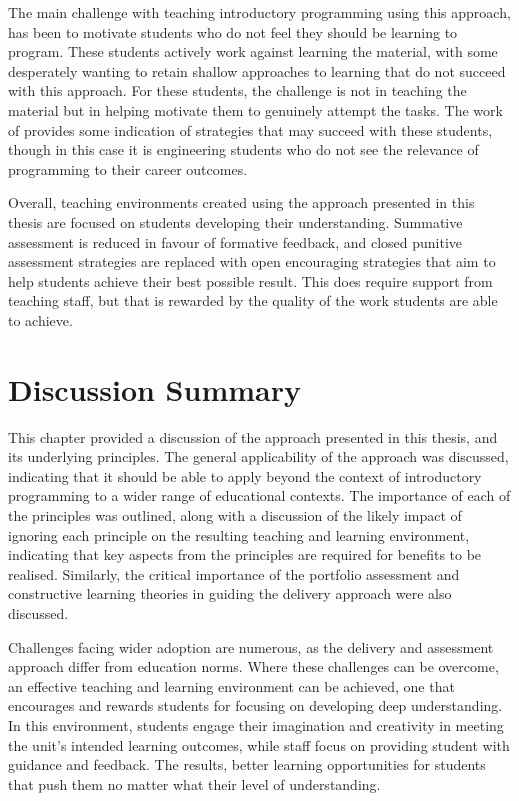 The main challenge with teaching introductory programming using this approach, has been to motivate students who do not feel they should be learning to program. These students actively work against learning the material, with some desperately wanting to retain shallow approaches to learning that do not succeed with this approach. For these students, the challenge is not in teaching the material but in helping motivate them to genuinely attempt the tasks. The work of \citet{Guzdial:2005} provides some indication of strategies that may succeed with these students, though in this case it is engineering students who do not see the relevance of programming to their career outcomes. 

Overall, teaching environments created using the approach presented in this thesis are focused on students developing their understanding. Summative assessment is reduced in favour of formative feedback, and closed punitive assessment strategies are replaced with open encouraging strategies that aim to help students achieve their best possible result. This does require support from teaching staff, but that is rewarded by the quality of the work students are able to achieve. 


\section{Discussion Summary} %
\label{sec:disc_summary}

This chapter provided a discussion of the approach presented in this thesis, and its underlying principles. The general applicability of the approach was discussed, indicating that it should be able to apply beyond the context of introductory programming to a wider range of educational contexts. The importance of each of the principles was outlined, along with a discussion of the likely impact of ignoring each principle on the resulting teaching and learning environment, indicating that key aspects from the principles are required for benefits to be realised. Similarly, the critical importance of the portfolio assessment and constructive learning theories in guiding the delivery approach were also discussed.

Challenges facing wider adoption are numerous, as the delivery and assessment approach differ from education norms. Where these challenges can be overcome, an effective teaching and learning environment can be achieved, one that encourages and rewards students for focusing on developing deep understanding. In this environment, students engage their imagination and creativity in meeting the unit's intended learning outcomes, while staff focus on providing student with guidance and feedback. The results, better learning opportunities for students that push them no matter what their level of understanding.


